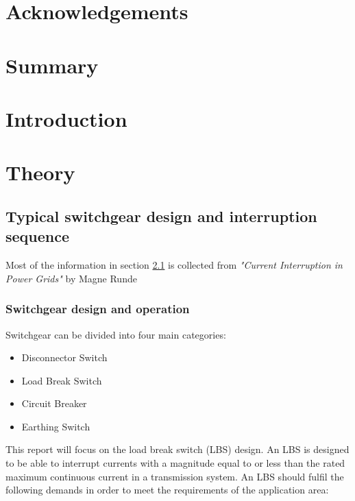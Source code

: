 \documentclass[10pt,b5paper,twoside]{article}
\begin{document}
\thispagestyle{empty}
\cleardoublepage
\section*{Acknowledgements}
\setcounter{page}{1}

\cleardoublepage
\section*{Summary}

\cleardoublepage
\setcounter{page}{1}
\tableofcontents
\cleardoublepage

\section{Introduction}

\cleardoublepage

\section{Theory}
\subsection{Typical switchgear design and interruption sequence} \label{sec:genDes}
Most of the information in section \ref{sec:genDes} is collected from \textit{"Current Interruption in Power Grids"} by Magne Runde \cite{bib:HVEbreak} \newline

\subsubsection{Switchgear design and operation} \label{sec:InterruptCurrent}
Switchgear can be divided into four main categories:
\begin{itemize}
\item Disconnector Switch
\item Load Break Switch
\item Circuit Breaker
\item Earthing Switch
\end{itemize}

This report will focus on the load break switch (LBS) design. An LBS is designed to be able to interrupt currents with a magnitude equal to or less than the rated maximum continuous current in a transmission system. An LBS should fulfil the following demands in order to meet the requirements of the application area:
\end{document}
